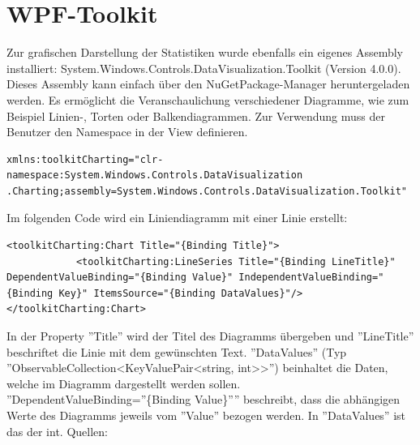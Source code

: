 \section{WPF-Toolkit}
Zur grafischen Darstellung der Statistiken wurde ebenfalls ein eigenes Assembly installiert:  System.Windows.Controls.DataVisualization.Toolkit (Version 4.0.0). Dieses Assembly kann einfach über den NuGetPackage-Manager heruntergeladen werden. Es ermöglicht die Veranschaulichung verschiedener Diagramme, wie zum Beispiel Linien-, Torten oder Balkendiagrammen. Zur Verwendung muss der Benutzer den Namespace in der View definieren.
\begin{lstlisting}
xmlns:toolkitCharting="clr-namespace:System.Windows.Controls.DataVisualization
.Charting;assembly=System.Windows.Controls.DataVisualization.Toolkit"
\end{lstlisting}
Im folgenden Code wird ein Liniendiagramm mit einer Linie erstellt:
\begin{lstlisting}
<toolkitCharting:Chart Title="{Binding Title}">
            <toolkitCharting:LineSeries Title="{Binding LineTitle}"  DependentValueBinding="{Binding Value}" IndependentValueBinding="{Binding Key}" ItemsSource="{Binding DataValues}"/>
</toolkitCharting:Chart>
\end{lstlisting}
In der Property ''Title'' wird der Titel des Diagramms übergeben und ''LineTitle'' beschriftet die Linie mit dem gewünschten Text. ''DataValues'' (Typ ''ObservableCollection\textless KeyValuePair\textless string, int\textgreater \textgreater'') beinhaltet die Daten, welche im Diagramm dargestellt werden sollen. ''DependentValueBinding=''\{Binding Value\}'''' beschreibt, dass die abhängigen Werte des Diagramms jeweils vom ''Value'' bezogen werden. In ''DataValues'' ist das der int. \newline
Quellen: \cite{c-sharpcorner_charting_2017}
